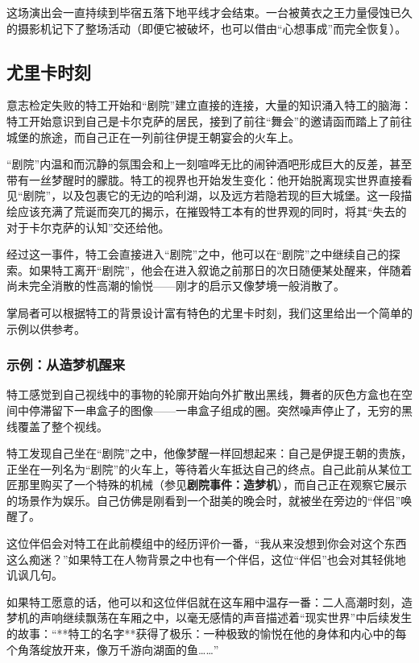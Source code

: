 这场演出会一直持续到毕宿五落下地平线才会结束。一台被黄衣之王力量侵蚀已久的摄影机记下了整场活动（即便它被破坏，也可以借由“心想事成”而完全恢复）。

\subsection{尤里卡时刻}
意志检定失败的特工开始和“剧院”建立直接的连接，大量的知识涌入特工的脑海：特工开始意识到自己是卡尔克萨的居民，接到了前往“舞会”的邀请函而踏上了前往城堡的旅途，而自己正在一列前往伊提王朝宴会的火车上。

“剧院”内温和而沉静的氛围会和上一刻喧哗无比的闹钟酒吧形成巨大的反差，甚至带有一丝梦醒时的朦胧。特工的视界也开始发生变化：他开始脱离现实世界直接看见“剧院”，以及包裹它的无边的哈利湖，以及远方若隐若现的巨大城堡。这一段描绘应该充满了荒诞而突兀的揭示，在摧毁特工本有的世界观的同时，将其“失去的对于卡尔克萨的认知”交还给他。

经过这一事件，特工会直接进入“剧院”之中，他可以在“剧院”之中继续自己的探索。如果特工离开“剧院”，他会在进入叙诡之前那日的次日随便某处醒来，伴随着尚未完全消散的性高潮的愉悦——刚才的启示又像梦境一般消散了。

掌局者可以根据特工的背景设计富有特色的尤里卡时刻，我们这里给出一个简单的示例以供参考。

\subsubsection{示例：从造梦机醒来}
特工感觉到自己视线中的事物的轮廓开始向外扩散出黑线，舞者的灰色方盒也在空间中停滞留下一串盒子的图像——一串盒子组成的圈。突然噪声停止了，无穷的黑线覆盖了整个视线。

特工发现自己坐在“剧院”之中，他像梦醒一样回想起来：自己是伊提王朝的贵族，正坐在一列名为“剧院”的火车上，等待着火车抵达自己的终点。自己此前从某位工匠那里购买了一个特殊的机械（参见\textbf{剧院事件：造梦机}），而自己正在观察它展示的场景作为娱乐。自己仿佛是刚看到一个甜美的晚会时，就被坐在旁边的“伴侣”唤醒了。

这位伴侣会对特工在此前模组中的经历评价一番，“我从来没想到你会对这个东西这么痴迷？”如果特工在人物背景之中也有一个伴侣，这位“伴侣”也会对其轻佻地讥讽几句。

如果特工愿意的话，他可以和这位伴侣就在这车厢中温存一番：二人高潮时刻，造梦机的声响继续飘荡在车厢之中，以毫无感情的声音描述着“现实世界”中后续发生的故事：“**特工的名字**获得了极乐：一种极致的愉悦在他的身体和内心中的每个角落绽放开来，像万千游向湖面的鱼……”

